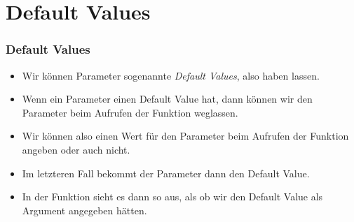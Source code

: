 \documentclass[aspectratio=169,mathserif,notheorems]{beamer}%
\begin{document}
\section{Default Values}%
%
\begin{frame}%
\frametitle{Default Values}%
%
\begin{itemize}%
\item Wir können Parameter sogenannte \emph{Default Values}, also  haben lassen.%
%
\item<2-> Wenn ein Parameter einen Default Value hat, dann können wir den Parameter beim Aufrufen der Funktion weglassen.%
%
\item<3-> Wir können also einen Wert für den Parameter beim Aufrufen der Funktion angeben oder auch nicht.%
%
\item<4-> Im letzteren Fall bekommt der Parameter dann den Default Value.%
%
\item<5-> In der Funktion sieht es dann so aus, als ob wir den Default Value als Argument angegeben hätten.%
%
\end{itemize}%
\end{frame}%
%
\end{document}
